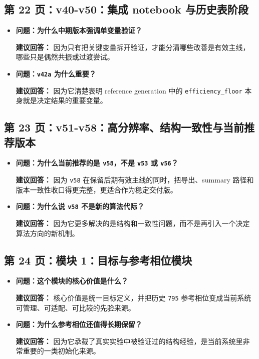 \documentclass[12pt,a4paper]{ctexart}
\begin{document}
\subsection{第 22 页：v40-v50：集成 notebook 与历史表阶段}
\begin{itemize}
\item \textbf{问题：为什么中期版本强调单变量验证？}

\textbf{建议回答：} 因为只有把关键变量拆开验证，才能分清哪些改善是有效主线，哪些只是偶然共振或过渡尝试。

\item \textbf{问题：\texttt{v42a} 为什么重要？}

\textbf{建议回答：} 因为它清楚表明 reference generation 中的 \texttt{efficiency\_floor} 本身就是决定结果的重要变量。
\end{itemize}

\subsection{第 23 页：v51-v58：高分辨率、结构一致性与当前推荐版本}
\begin{itemize}
\item \textbf{问题：为什么当前推荐的是 \texttt{v58}，不是 \texttt{v53} 或 \texttt{v56}？}

\textbf{建议回答：} 因为 \texttt{v58} 在保留后期有效主线的同时，把导出、summary 路径和版本一致性收口得更完整，更适合作为稳定交付版。

\item \textbf{问题：为什么说 \texttt{v58} 不是新的算法代际？}

\textbf{建议回答：} 因为它更多解决的是结构和一致性问题，而不是再引入一个决定算法方向的新机制。
\end{itemize}

\subsection{第 24 页：模块 1：目标与参考相位模块}
\begin{itemize}
\item \textbf{问题：这个模块的核心价值是什么？}

\textbf{建议回答：} 核心价值是统一目标定义，并把历史 \texttt{795} 参考相位变成当前系统可管理、可适配、可比较的先验来源。

\item \textbf{问题：为什么参考相位还值得长期保留？}

\textbf{建议回答：} 因为它承载了真实实验中被验证过的结构经验，是当前系统里非常重要的一类初始化来源。
\end{itemize}
\end{document}
